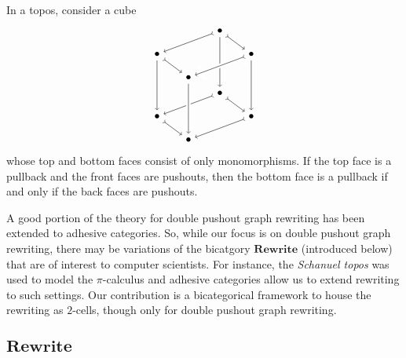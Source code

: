 \documentclass{tac}
\newcommand{\cat}[1]{\mathbf{#1}}
\begin{document}
	 \label{lem.vk dual}
	In a topos, consider a cube
	\[
		\begin{tikzpicture}
		\node (tb) at (2,2.75) {$\bullet$};
		\node (tl) at (0,2) {$\bullet$};
		\node (tr) at (3,2) {$\bullet$};
		\node (tf) at (1,1.25) {$\bullet$};
		\node (bb) at (2,0.75) {$\bullet$};
		\node (bl) at (0,0) {$\bullet$};
		\node (br) at (3,0) {$\bullet$};
		\node (bf) at (1,-.75) {$\bullet$};
		\draw [>->] (tb) edge (tr);
		\draw [->] (tb) edge (bb);
		\draw [>->] (tb) edge (tl);
		\draw [->] (tr) edge (br);
		\draw [>->] (tl) edge (tf);
		\draw [->] (tl) edge (bl);
		\draw [>->] (bb) edge (br);
		\draw [>->] (bb) edge (bl);
		\draw [>->] (br) edge (bf);
		\draw [>->] (bl) edge (bf);
		\draw [->] (tf) edge[white,line width=4pt] (bf);
		\draw [->] (tf) edge (bf);
		\draw [>->] (tr) edge[white,line width=4pt] (tf);
		\draw [>->] (tr) edge (tf);
		\end{tikzpicture}
	\]
	whose top and bottom faces consist of only monomorphisms. 
	If the top face is a pullback and the front faces are pushouts, 
	then the bottom face is a pullback if and only if the 
	back faces are pushouts.
\endlemma

A good portion of the theory for double pushout graph rewriting 
has been extended to adhesive categories. 
So, while our focus is on double pushout graph rewriting, 
there may be variations of the bicatgory $\cat{Rewrite}$ (introduced below) 
that are of interest to computer scientists.  For instance, 
the \emph{Schanuel topos} was used to model the $\pi$-calculus
	\cite{Fiore_OpModelsProcessCalulii} 
and adhesive categories allow us to extend rewriting to such settings.  
Our contribution is a bicategorical framework to house the rewriting as $2$-cells, 
though only for double pushout graph rewriting.


\subsection{$\cat{Rewrite}$}
\label{sec.Rewrite}
\end{document}
